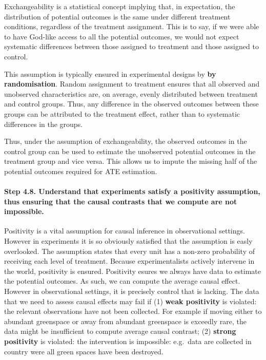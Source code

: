 \documentclass[
  singlecolumn]{article}
\let\oldparagraph\paragraph
\renewcommand{\paragraph}[1]{\oldparagraph{#1}\mbox{}}
\begin{document}
Exchangeability is a statistical concept implying that, in expectation,
the distribution of potential outcomes is the same under different
treatment conditions, regardless of the treatment assignment. This is to
say, if we were able to have God-like access to all the potential
outcomes, we would not expect systematic differences between those
assigned to treatment and those assigned to control.

This assumption is typically ensured in experimental designs by
\textbf{by randomisation}. Random assignment to treatment ensures that
all observed and unobserved characteristics are, on average, evenly
distributed between treatment and control groups. Thus, any difference
in the observed outcomes between these groups can be attributed to the
treatment effect, rather than to systematic differences in the groups.

Thus, under the assumption of exchangeability, the observed outcomes in
the control group can be used to estimate the unobserved potential
outcomes in the treatment group and vice versa. This allows us to impute
the missing half of the potential outcomes required for ATE estimation.

\paragraph{\texorpdfstring{\textbf{Step 4.8. Understand that experiments
satisfy a positivity assumption, thus ensuring that the causal contrasts
that we compute are not
impossible.}}{Step 4.8. Understand that experiments satisfy a positivity assumption, thus ensuring that the causal contrasts that we compute are not impossible.}}\label{step-4.8.-understand-that-experiments-satisfy-a-positivity-assumption-thus-ensuring-that-the-causal-contrasts-that-we-compute-are-not-impossible.}

Positivity is a vital assumption for causal inference in observational
settings. However in experiments it is so obviously satisfied that the
assumption is easly overlooked. The assumption states that every unit
has a non-zero probability of receiving each level of treatment. Because
experimentalists actively intervene in the world, positivity is ensured.
Positivity esures we always have data to estimate the potential
outcomes. As such, we can compute the average causal effect. However in
observational settings, it is precisely control that is lacking. The
data that we need to assess causal effects may fail if (1) \textbf{weak
positivity} is violated: the relevant observations have not been
collected. For example if moving either to abundant greenspace or away
from abundant greenspace is exceedly rare, the data might be
insufficient to compute average causal contrast; (2) \textbf{strong
positivity} is violated: the intervention is impossible: e.g.~data are
collected in country were all green spaces have been destroyed.
\end{document}
